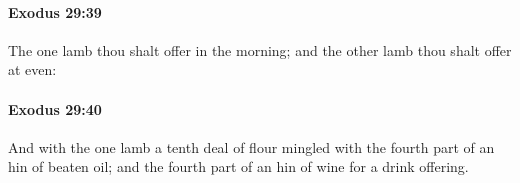 		\paragraph{Exodus 29:39} %
			\label{EXODUS-29-39}

			The one lamb thou shalt offer in the morning; and the other lamb thou shalt offer at even:


		\paragraph{Exodus 29:40} %
			\label{EXODUS-29-40}

			And with the one lamb a tenth deal of flour mingled with the fourth part of an hin of beaten oil; and the fourth part of an hin of wine for a drink offering.


